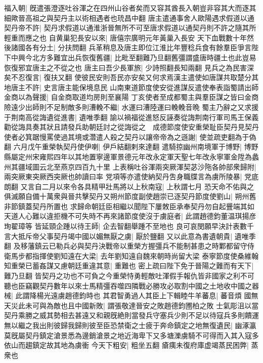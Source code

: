 福入朝|{
	旣遣張澄逐吐谷渾之在四州山谷者矣而又容其酋長入朝豈非容其大而逐其細歟晉高祖之與契丹主以術相遇者也珫昌中翻}
唐主遣通事舍人歐陽遇求假道以通契丹帝不許|{
	契丹求假道以通淮浙晉無所不可至唐求假道以通契丹則不許之隨其所輕重而應之也}
自黄巢犯長安以來|{
	唐僖宗廣明元年黃巢入長安}
天下血戰數十年然後諸國各有分土|{
	分扶問翻}
兵革稍息及唐主即位江淮比年豐稔兵食有餘羣臣爭言陛下中興今北方多難宜出兵恢復舊疆|{
	比毗至翻難乃旦翻舊彊謂盛唐時疆土也此豈易恢復邪宜唐主之不從之也}
唐主曰吾少長軍旅|{
	少詩照翻長知兩翻}
見兵之為民害深矣不忍復言|{
	復扶又翻}
使彼民安則吾民亦安矣又何求焉漢主遣使如唐謀共取楚分其地唐主不許|{
	史言唐主能保境息民}
山南東道節度使安從進謀反遣使奉表詣蜀請出師金商以為聲援|{
	自金商取道均房則至襄陽}
丁亥使者至成都蜀主與羣臣謀之皆曰金商險遠少出師則不足制敵多則漕輓不繼|{
	水運曰漕陸運曰輓輓音晩}
蜀主乃辭之又求援于荆南高從誨遺從進書|{
	遺唯季翻}
諭以禍福從進怒反誣奏從誨荆南行軍司馬王保義勸從誨具奏其狀且請發兵助朝廷討之從誨從之　成德節度使安重榮耻臣契丹見契丹使者必箕踞慢罵使過其境或濳遣人殺之契丹以讓帝帝為之遜謝|{
	使並疏吏翻為于偽翻}
六月戊午重榮執契丹使伊喇|{
	伊戶結翻剌來達翻}
遣騎掠幽州南境軍于博野|{
	博野縣屬定州宋雍熙四年以其地置寧邊軍景德元年改永定軍天聖七年改永寧軍金陞為蠡州其疆域圖云北至燕京四百九十里}
上表稱吐谷渾兩突厥渾契苾沙陁各帥部衆歸附|{
	兩突厥東突厥西突厥也帥讀曰率}
党項等亦遣使納契丹吿身職牒言為虜所陵暴|{
	党底朗翻}
又言自二月以來令各具精甲壯馬將以上秋南寇|{
	上秋謂七月}
恐天命不佑與之俱滅願自備十萬衆與晉共擊契丹又朔州節度副使趙崇已逐契丹節度使劉山|{
	朔州舊非節鎮蓋契丹所置也}
求歸命朝廷臣相繼以聞陛下屢敇臣承奉契丹勿自起舋端其如天道人心難以違拒機不可失時不再來諸節度使沒于虜庭者|{
	此謂趙德鈞董温琪揚彦珣翟璋等}
皆延頸企踵以待王師|{
	企去智翻舉踵不至地也}
良可哀閔願早決計表數千言大抵斥帝父事契丹竭中國以媚無厭之虜|{
	厭於鹽翻}
又以此意為書遺朝貴|{
	遺唯季翻}
及移藩鎮云已勒兵必與契丹決戰帝以重榮方握彊兵不能制甚患之時鄴都留守侍衛馬步都指揮使劉知遠在大梁|{
	去年劉知遠自魏來朝時尚留大梁}
泰寧節度使桑維翰知重榮已蓄姦謀又慮朝廷重違其意|{
	重難也}
密上疏曰陛下免于晉陽之難而有天下|{
	難乃旦翻}
皆契丹之功也不可負之今重榮恃勇輕敵吐渾假手報仇皆非國家之利不可聽也臣竊觀契丹數年以來士馬精彊吞噬四隣戰必勝攻必取割中國之土地收中國之器械|{
	此謂降楊光遠虜趙德鈞時也}
其君智勇過人其臣上下輯睦牛羊蕃息|{
	蕃音煩}
國無天災此未可與為敵也且中國新敗|{
	謂張敬達晉安之敗趙德鈞圑柏之敗}
士氣彫沮以當契丹乘勝之威其勢相去甚遠又和親旣絶則當發兵守塞兵少則不足以待寇兵多則饋運無以繼之我出則彼歸我歸則彼至臣恐禁衛之士疲于奔命鎮定之地無復遺民|{
	幽涿瀛莫旣屬契丹鎮定滄景悉為邊銷滄景之地近海卑下又多塘濼虜騎不可得而入其入寇多依山而趨鎮定故其地為虜衝}
今天下粗安|{
	粗坐五翻}
瘡痍未復府庫虚竭蒸民困弊|{
	蒸衆也}
